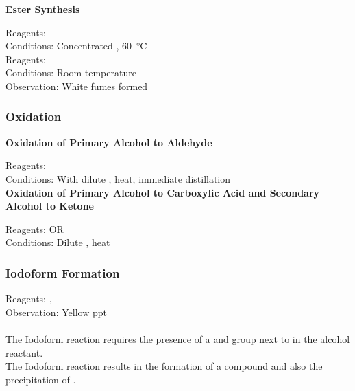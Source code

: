 \documentclass[../main]{subfiles}
\begin{document}
	\noindent \textbf{Ester Synthesis}

	Reagents:  \\
	Conditions:  Concentrated , \SI{60}{\celsius} \\

	Reagents:  \\
	Conditions:  Room temperature \\
	Observation: White fumes formed  \\

	\subsubsection{Oxidation}

	\noindent \textbf{Oxidation of Primary Alcohol to Aldehyde}

	Reagents:  \\
	Conditions: With dilute , heat, immediate distillation \\

	\noindent \textbf{Oxidation of Primary Alcohol to Carboxylic Acid and Secondary Alcohol to Ketone}

	Reagents:  OR  \\
	Conditions: Dilute , heat \\

	\subsubsection{Iodoform Formation}

	Reagents: ,  \\
	Observation: Yellow ppt  \\

	 \\

	The Iodoform reaction requires the presence of a  and  group next to  in the alcohol reactant. \\

	The Iodoform reaction results in the formation of a  compound and also the precipitation of . \\
\end{document}
